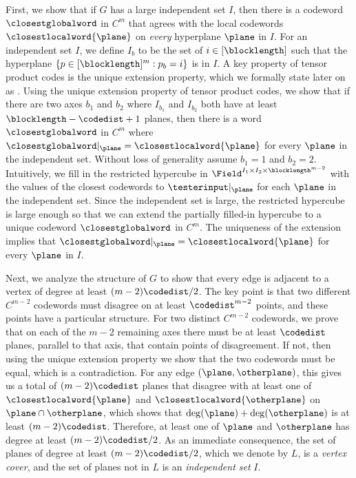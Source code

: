 \documentclass{toc}
\theoremstyle{plain}
\begin{document}
First, we show that if $G$ has a large independent set $I$, then there is a codeword $\closestglobalword$ in $C^{m}$ that agrees with the local codewords $\closestlocalword{\plane}$ on \emph{every} hyperplane $\plane$ in $I$. For an independent set $I$, we define $I_b$ to be the set of $i \in [\blocklength]$ such that the hyperplane $\{p \in [\blocklength]^m : p_b = i\}$ is in $I$. A key property of tensor product codes is the unique extension property, which we formally state later on as . Using the unique extension property of tensor product codes, we show that if there are two axes $b_1$ and $b_2$ where $I_{b_1}$ and $I_{b_2}$ both have at least $\blocklength - \codedist + 1$ planes, then there is a word $\closestglobalword$ in $C^m$ where $\closestglobalword \vert_{\plane} = \closestlocalword{\plane}$ for every $\plane$ in the independent set. Without loss of generality assume $b_1 = 1$ and $b_2 = 2$. Intuitively, we fill in the restricted hypercube in $\Field^{I_1 \times I_2 \times \blocklength^{m-2}}$ with the values of the closest codewords to $\testerinput \vert_{\plane}$ for each $\plane$ in the independent set. Since the independent set is large, the restricted hypercube is large enough so that we can extend the partially filled-in hypercube to a unique codeword $\closestglobalword$ in $C^m$. The uniqueness of the extension implies that $\closestglobalword \vert_{\plane} = \closestlocalword{\plane}$ for every $\plane$ in $I$.

Next, we analyze the structure of $G$ to show that every edge is adjacent to a vertex of degree at least $(m-2)\codedist/2$. The key point is that two different $C^{m-2}$ codewords must disagree on at least $\codedist^{m-2}$ points, and these points have a particular structure. For two distinct $C^{m-2}$ codewords, we prove that on each of the $m-2$ remaining axes there must be at least $\codedist$ planes, parallel to that axis, that contain points of disagreement. If not, then using the unique extension property we show that the two codewords must be equal, which is a contradiction. For any edge $(\plane, \otherplane)$, this gives us a total of $(m-2)\codedist$ planes that disagree with at least one of $\closestlocalword{\plane}$ and $\closestlocalword{\otherplane}$ on $\plane \cap \otherplane$, which shows that $\deg(\plane) + \deg(\otherplane)$ is at least $(m-2)\codedist$. Therefore, at least one of $\plane$ and $\otherplane$ has degree at least $(m-2)\codedist/2$. As an immediate consequence,
%
the set of planes of degree                                                         %
at least $(m-2)\codedist/2$, which we denote by $L$, is a \emph{vertex cover}, and the set of planes not in $L$ is an \emph{independent set} $I$.
\end{document}
